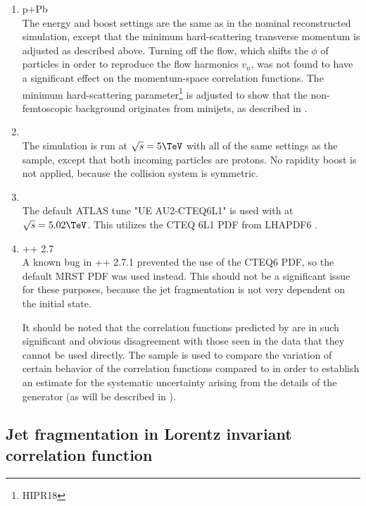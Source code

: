 \begin{enumerate}
\item \Hijing p+Pb \cite{Gyulassy:1994ew}\\
  The energy and boost settings are the same as in the nominal \pPb reconstructed simulation, except that the minimum hard-scattering transverse momentum is adjusted as described above.
  Turning off the flow, which shifts the $\phi$ of particles in order to reproduce the flow harmonics $v_n$, was not found to have a significant effect on the momentum-space correlation functions.
  The minimum hard-scattering \pt parameter\footnote{HIPR18} is adjusted to show that the non-femtoscopic background originates from minijets, as described in .

\item \Hijing \pp\\
  The simulation is run at $\sqrt{s} = 5 \TeV$ with all of the same settings as the \pPb sample, except that both incoming particles are protons.
  No rapidity boost is not applied, because the collision system is symmetric.

\item {} \pp \cite{Sjostrand:2007gs}\\
The default ATLAS tune "UE AU2-CTEQ6L1" is used with \PYEight at $\sqrt{s} = 5.02 \TeV$.
This utilizes the CTEQ 6L1 \ac{PDF} from LHAPDF6 \cite{Buckley:2014ana}.

\item \Herwig++ 2.7 \pp \cite{Bahr:2008pv}\\
A known bug in \Herwig++ 2.7.1 prevented the use of the CTEQ6 \ac{PDF}, so the default MRST \ac{PDF} was used instead.
This should not be a significant issue for these purposes, because the jet fragmentation is not very dependent on the initial state.

It should be noted that the correlation functions predicted by \Herwig are in such significant and obvious disagreement with those seen in the data that they cannot be used directly.
The \Herwig sample is used to compare the variation of certain behavior of the correlation functions compared to \Pythia in order to establish an estimate for the systematic uncertainty arising from the details of the generator (as will be described in ).
\end{enumerate}


\subsection{Jet fragmentation in Lorentz invariant correlation function}
\label{subsec:jet_frag_inv}

